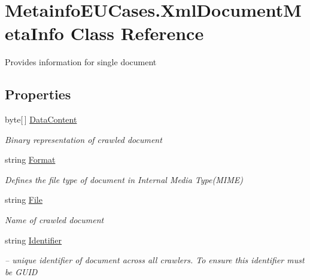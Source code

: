 \hypertarget{class_metainfo_e_u_cases_1_1_xml_document_meta_info}{\section{Metainfo\-E\-U\-Cases.\-Xml\-Document\-Meta\-Info Class Reference}
\label{class_metainfo_e_u_cases_1_1_xml_document_meta_info}
}


Provides information for single document  


\subsection*{Properties}
\begin{DoxyCompactItemize}
\item 
byte\mbox{[}$\,$\mbox{]} \hyperlink{class_metainfo_e_u_cases_1_1_xml_document_meta_info_afd47cd5b646ea8912d185b850e83c541}{Data\-Content}
\begin{DoxyCompactList}\small\item\em Binary representation of crawled document \end{DoxyCompactList}\item 
string \hyperlink{class_metainfo_e_u_cases_1_1_xml_document_meta_info_afd0619ebe1e7c2592d72ab10982e551e}{Format}
\begin{DoxyCompactList}\small\item\em Defines the file type of document in Internal Media Type(\-M\-I\-M\-E) \end{DoxyCompactList}\item 
string \hyperlink{class_metainfo_e_u_cases_1_1_xml_document_meta_info_aa34330040fdd529c5fb3ed459525e0fa}{File}
\begin{DoxyCompactList}\small\item\em Name of crawled document \end{DoxyCompactList}\item 
string \hyperlink{class_metainfo_e_u_cases_1_1_xml_document_meta_info_ae3037fb0c032e1aafee527da90cf4343}{Identifier}
\begin{DoxyCompactList}\small\item\em – unique identifier of document across all crawlers. To ensure this identifier must be G\-U\-I\-D \end{DoxyCompactList}\item 

\end{DoxyCompactItemize}
